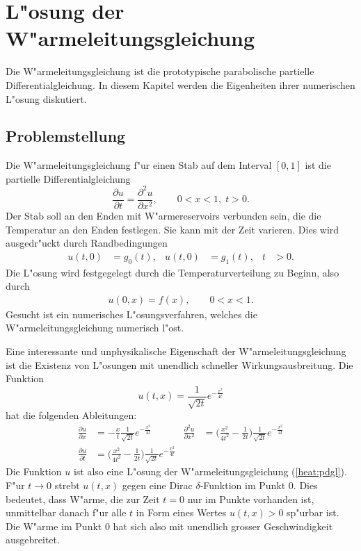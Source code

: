 \chapter{L"osung der W"armeleitungsgleichung}


Die W"armeleitungsgleichung ist die prototypische parabolische
partielle Differentialgleichung.
In diesem Kapitel werden die Eigenheiten ihrer numerischen L"osung
diskutiert.

\section{Problemstellung}
Die W"armeleitungsgleichung f"ur einen Stab
auf dem Interval $[0,1]$ ist die partielle Differentialgleichung
\begin{equation}
\frac{\partial u}{\partial t}=\frac{\partial^2 u}{\partial x^2}, \qquad
0<x<1,\;t>0.
\label{heat:pdgl}
\end{equation}
Der Stab soll an den Enden mit W"armereservoirs verbunden sein, die
die Temperatur an den Enden festlegen. Sie kann mit der Zeit varieren.
Dies wird ausgedr"uckt durch
Randbedingungen
\begin{align}
u(t,0)&=g_0(t),
&
u(t,0)&=g_1(t),&t&>0.
\label{heat:rand}
\end{align}
Die L"osung wird festgegelegt durch die Temperaturverteilung zu Beginn,
also durch
\begin{align}
u(0,x)=f(x),\qquad 0<x<1.
\end{align}
Gesucht ist ein numerisches L"osungsverfahren, welches die
W"armeleitungsgleichung numerisch l"ost.

Eine interessante und unphysikalische Eigenschaft der W"armeleitungsgleichung
ist die Existenz von L"osungen mit unendlich schneller Wirkungsausbreitung.
Die Funktion
\[
u(t,x)=\frac1{\sqrt{2t}}e^{-\frac{x^2}{4t}}
\]
hat die folgenden Ableitungen:
\begin{align*}
\frac{\partial u}{\partial x}&=
-
\frac{x}{t}
\frac1{\sqrt{2t}}
e^{-\frac{x^2}{4t}}
&
\frac{\partial^2 u}{\partial x^2}&=
\biggl(\frac{x^2}{4t^2}-\frac1{2t}\biggr)
\frac1{\sqrt{2t}}
e^{-\frac{x^2}{4t}}
\\
\frac{\partial u}{\partial t}&=
\biggl(\frac{x^2}{4t^2}-\frac1{2t}\biggr)
\frac1{\sqrt{2t}}
e^{-\frac{x^2}{4t}}
\end{align*}
Die Funktion $u$ ist also eine L"osung der W"armeleitungsgleichung
(\ref{heat:pdgl}).
F"ur $t\to 0$ strebt $u(t,x)$ gegen eine Dirac $\delta$-Funktion
im Punkt 0.
Dies bedeutet, dass W"arme, die zur Zeit $t=0$ nur im Punkte vorhanden
ist, unmittelbar danach f"ur alle $t$ in Form eines Wertes $u(t,x) > 0$
sp"urbar ist.
Die W"arme im Punkt $0$ hat sich also mit unendlich grosser Geschwindigkeit
ausgebreitet.

